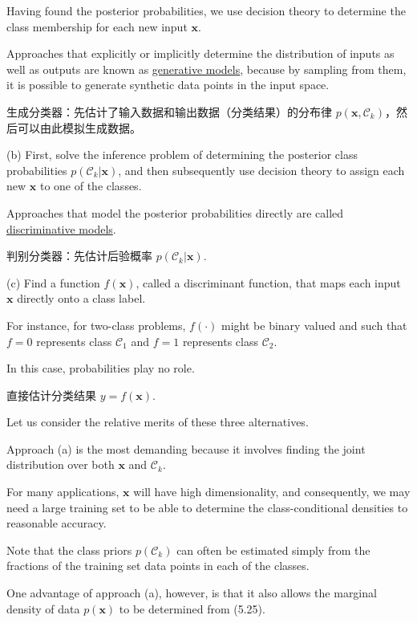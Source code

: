 \documentclass{article}
\begin{document}
Having found the posterior probabilities, we use decision theory to determine the class membership for each new input $\mathbf{x}$. 

Approaches that explicitly or implicitly determine the distribution of inputs as well as outputs are known as \underline{\color{red}generative models}, because by sampling from them, it is possible to generate synthetic data points in the input space.

{\color{red}
生成分类器：先估计了输入数据和输出数据（分类结果）的分布律 $p(\mathbf{x}, \mathcal{C}_{k})$，然后可以由此模拟生成数据。
}

(b) First, solve the inference problem of determining the posterior class probabilities $p(\mathcal{C}_{k}|\mathbf{x})$, and then subsequently use decision theory to assign each new $\mathbf{x}$ to one of the classes. 

Approaches that model the posterior probabilities directly are called \underline{\color{red}discriminative models}.

{\color{red}
判别分类器：先估计后验概率 $p(\mathcal{C}_{k}|\mathbf{x})$. 
}

(c) Find a function $f(\mathbf{x})$, called a discriminant function, that maps each input $\mathbf{x}$ directly onto a class label. 

For instance, for two-class problems, $f(\cdot)$ might be binary valued and such that $f=0$ represents class $\mathcal{C}_{1}$ and $f=1$ represents class $\mathcal{C}_{2}$. 

In this case, probabilities play no role.

{\color{red}
直接估计分类结果 $y=f(\mathbf{x})$. 
}

Let us consider the relative merits of these three alternatives. 

Approach (a) is the most demanding because it involves finding the joint distribution over both $\mathbf{x}$ and $\mathcal{C}_{k}$. 

For many applications, $\mathbf{x}$ will have high dimensionality, and consequently, we may need a large training set to be able to determine the class-conditional densities to reasonable accuracy. 

Note that the class priors $p(\mathcal{C}_{k})$ can often be estimated simply from the fractions of the training set data points in each of the classes. 

One advantage of approach (a), however, is that it also allows the marginal density of data $p(\mathbf{x})$ to be determined from (5.25). 
\end{document}
